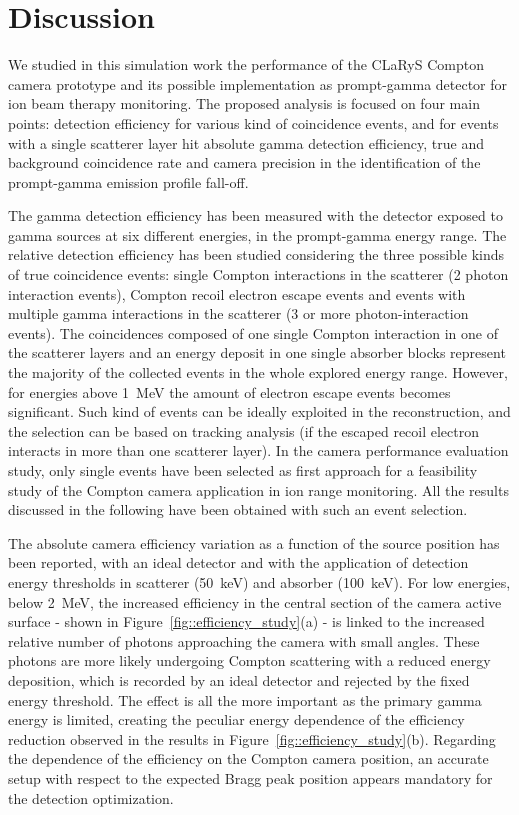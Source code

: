 \section{Discussion}

We studied in this simulation work the performance of the CLaRyS Compton camera prototype and its possible implementation as prompt-gamma detector for ion beam therapy monitoring. The proposed analysis is focused on four main points: detection efficiency for various kind of coincidence events, and for events with a single scatterer layer hit absolute gamma detection efficiency, true and background coincidence rate and camera precision in the identification of the prompt-gamma emission profile fall-off.

The gamma detection efficiency has been measured with the detector exposed to gamma sources at six different energies, in the prompt-gamma energy range. The relative detection efficiency has been studied considering the three possible kinds of true coincidence events: single Compton interactions in the scatterer (2 photon interaction events), Compton recoil electron escape events and events with multiple gamma interactions in the scatterer (3 or more photon-interaction events). The coincidences composed of one single Compton interaction in one of the scatterer layers and an energy deposit in one single absorber blocks represent the majority of the collected events in the whole explored energy range. However, for energies above 1~MeV the amount of electron escape events becomes significant. Such kind of events can be ideally exploited in the reconstruction, and the selection can be based on tracking analysis (if the escaped recoil electron interacts in more than one scatterer layer). In the camera performance evaluation study, only single events have been selected as first approach for a feasibility study of the Compton camera application in ion range monitoring. 
All the results discussed in the following have been obtained with such an event selection.

The absolute camera efficiency variation as a function of the source position has been reported, with an ideal detector and with the application of detection energy thresholds in scatterer (50~keV) and absorber (100~keV). 
For low energies, below 2~MeV, the increased efficiency in the central section of the camera active surface - shown in Figure~\ref{fig::efficiency_study}(a) - is linked to the increased relative number of photons approaching the camera with small angles. These photons are more likely undergoing Compton scattering with a reduced energy deposition, which is recorded by an ideal detector and rejected by the fixed energy threshold. The effect is all the more important as the primary gamma energy is limited, creating the peculiar energy dependence of the efficiency reduction observed in the results in Figure~\ref{fig::efficiency_study}(b).
Regarding the dependence of the efficiency on the Compton camera position, an accurate setup with respect to the expected Bragg peak position appears mandatory for the detection optimization.

